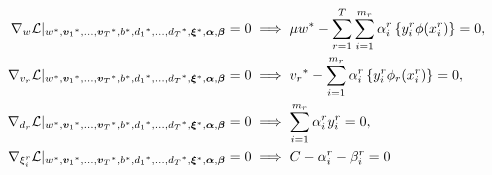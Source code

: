 \begin{align}
    \grad_{{w}} \lagr \vert_{\optim{{w}}, \optim{\fv{v}_1}, \ldots, \optim{\fv{v}_\ntasks}, \optim{b}, \optim{d_1}, \ldots, \optim{d_\ntasks}, \optim{\fv{\xi}}, {\fv{\alpha}}, {\fv{\beta}}} = 0  &\implies \mu \optim{{w}} - \sum_{r= 1}^T \sum_{i=1}^{m_r} {\alpha_i^r} \left\lbrace y_i^r \phi(x_i^r) \right\rbrace = 0 , \label{eq:common_repr_add} \\
    \grad_{{v}_r} \lagr \vert_{\optim{{w}}, \optim{\fv{v}_1}, \ldots, \optim{\fv{v}_\ntasks}, \optim{b}, \optim{d_1}, \ldots, \optim{d_\ntasks}, \optim{\fv{\xi}}, {\fv{\alpha}}, {\fv{\beta}}} = 0 &\implies \optim{{v}_r} - \sum_{i=1}^{m_r} {\alpha_i^r} \left\lbrace y_i^r \phi_r(x_i^r) \right\rbrace = 0 , \label{eq:specific_repr_add} \\
    \grad_{d_r} \lagr \vert_{\optim{{w}}, \optim{\fv{v}_1}, \ldots, \optim{\fv{v}_\ntasks}, \optim{b}, \optim{d_1}, \ldots, \optim{d_\ntasks}, \optim{\fv{\xi}}, {\fv{\alpha}}, {\fv{\beta}}} = 0 &\implies \sum_{i=1}^{m_r} {\alpha_i^r} y_i^r = 0 , \label{eq:specific_eqconstr_add} \\
    \grad_{\xi_i^r} \lagr \vert_{\optim{{w}}, \optim{\fv{v}_1}, \ldots, \optim{\fv{v}_\ntasks}, \optim{b}, \optim{d_1}, \ldots, \optim{d_\ntasks}, \optim{\fv{\xi}}, {\fv{\alpha}}, {\fv{\beta}}} = 0 &\implies C - {\alpha_i^r} - {\beta_i^r} = 0 \label{eq:xi_feas_add}
\end{align}
